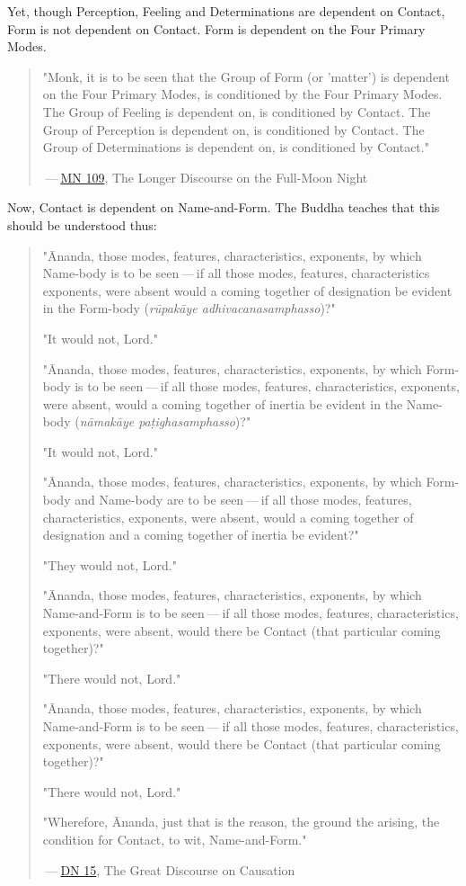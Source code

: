 Yet, though Perception, Feeling and Determinations are dependent on
Contact, Form is not dependent on Contact. Form is dependent on the Four
Primary Modes.


\begin{quotation}
\label{dependent}"Monk, it is to be seen that the Group of Form (or 'matter') is
dependent on the Four Primary Modes, is conditioned by the Four Primary
Modes. The Group of Feeling is dependent on, is conditioned by Contact.
The Group of Perception is dependent on, is conditioned by Contact. The
Group of Determinations is dependent on, is conditioned by
Contact."


 — \href{https://suttacentral.net/mn109/en/sujato}{MN 109}, The Longer Discourse on the Full-Moon Night


\end{quotation}

Now, Contact is dependent on Name-and-Form. The Buddha teaches that this
should be understood thus:


\begin{quotation}
"Ānanda, those modes, features, characteristics, exponents, by which
Name-body is to be seen — if all those modes, features, characteristics
exponents, were absent would a coming together of designation be evident
in the Form-body (\emph{rūpakāye adhivacanasamphasso})?"


"It would not, Lord."


"Ānanda, those modes, features, characteristics, exponents, by which
Form-body is to be seen — if all those modes, features, characteristics,
exponents, were absent, would a coming together of inertia be evident in
the Name-body (\emph{nāmakāye paṭighasamphasso})?"


"It would not, Lord."


"Ānanda, those modes, features, characteristics, exponents, by which
Form-body and Name-body are to be seen — if all those modes, features,
characteristics, exponents, were absent, would a coming together of
designation and a coming together of inertia be evident?"


"They would not, Lord."


"Ānanda, those modes, features, characteristics, exponents, by which
Name-and-Form is to be seen — if all those modes, features,
characteristics, exponents, were absent, would there be Contact (that
particular coming together)?"


"There would not, Lord."


"Ānanda, those modes, features, characteristics, exponents, by which
Name-and-Form is to be seen — if all those modes, features,
characteristics, exponents, were absent, would there be Contact (that
particular coming together)?"


"There would not, Lord."


"Wherefore, Ānanda, just that is the reason, the ground the arising, the
condition for Contact, to wit, Name-and-Form."


 — \href{https://suttacentral.net/dn15/en/bodhi}{DN 15}, The Great Discourse on Causation


\end{quotation}

